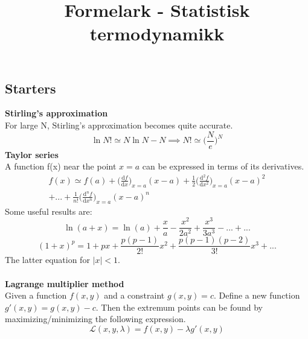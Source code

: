 \documentclass[8pt]{article}
\numberwithin{equation}{section}
\begin{document}
\title{Formelark - Statistisk termodynamikk}

\maketitle


\begin{multicols}{2}
\section{Starters}
\textbf{Stirling's approximation}\\
For large N, Stirling's approximation becomes quite accurate. 
\begin{equation}
\ln{N!}\simeq N\ln{N}-N \implies N!\simeq \bigg(\frac{N}{e} \bigg)^{N}
\end{equation}
\textbf{Taylor series}\\
A function f(x) near the point $x=a$ can be expressed in terms of its derivatives. 
\begin{gather}
f(x)\simeq f(a)+\bigg(\frac{\mathrm{d}f}{\mathrm{d}x}\bigg)_{x=a}(x-a)+\frac{1}{2}\bigg(\frac{\mathrm{d}^{2}f}{\mathrm{d}x^{2}}\bigg)_{x=a}(x-a)^2\\+...+\frac{1}{n!}\bigg(\frac{\mathrm{d}^{n}f}{\mathrm{d}x^{n}}\bigg)_{x=a}(x-a)^{n}
\end{gather}
Some useful results are: 
\begin{equation}
\ln{(a+x)}=\ln{(a)}+\frac{x}{a}-\frac{x^{2}}{2a^{2}}+\frac{x^{3}}{3a^{3}}-...+...
\end{equation}
\begin{equation}
(1+x)^{p}=1+px+\frac{p(p-1)}{2!}x^{2}+\frac{p(p-1)(p-2)}{3!}x^{3}+...
\end{equation}
The latter equation for $|x|<1$. \\ \\ 
\textbf{Lagrange multiplier method} \\
Given a function $f(x,y)$ and a constraint $g(x,y)=c$. Define a new function $g'(x,y)=g(x,y)-c$. Then the extremum points can be found by maximizing/minimizing the following expression.  
\begin{equation}
\mathscr{L}(x,y,\lambda)=f(x,y)-\lambda g'(x,y)
\end{equation}

\end{multicols}
\end{document}
